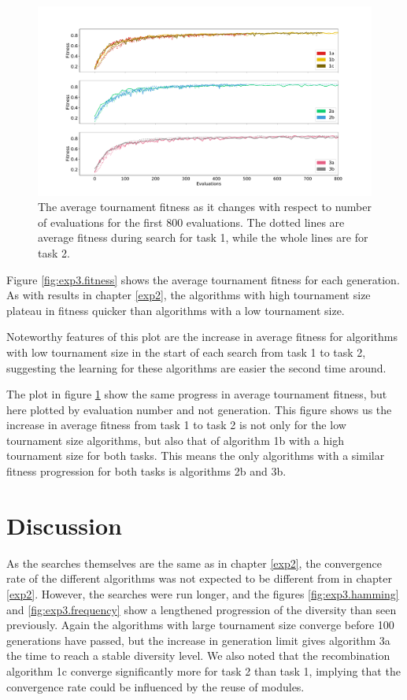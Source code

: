 \begin{figure}
    \includegraphics[width=1.25\textwidth, center]{Chapters/4.Experiments/exp3/figures/fitness_by_evaluations.pdf}
    \caption[Average tournament fitness plotted by evaluation]{The average tournament fitness as it changes with respect to number of evaluations for the first 800 evaluations. The dotted lines are average fitness during search for task 1, while the whole lines are for task 2.}
    \label{fig:exp3.fitness_by_evaluations}
\end{figure}

Figure \ref{fig:exp3.fitness} shows the average tournament fitness for each generation. As with results in chapter \ref{exp2}, the algorithms with high tournament size plateau in fitness quicker than algorithms with a low tournament size.

Noteworthy features of this plot are the increase in average fitness for algorithms with low tournament size in the start of each search from task 1 to task 2, suggesting the learning for these algorithms are easier the second time around. 

The plot in figure \ref{fig:exp3.fitness_by_evaluations} show the same progress in average tournament fitness, but here plotted by evaluation number and not generation. This figure shows us the increase in average fitness from task 1 to task 2 is not only for the low tournament size algorithms, but also that of algorithm 1b with a high tournament size for both tasks. This means the only algorithms with a similar fitness progression for both tasks is algorithms 2b and 3b. 

\section{Discussion}
As the searches themselves are the same as in chapter \ref{exp2}, the convergence rate of the different algorithms was not expected to be different from in chapter \ref{exp2}. However, the searches were run longer, and the figures \ref{fig:exp3.hamming} and \ref{fig:exp3.frequency} show a lengthened progression of the diversity than seen previously. Again the algorithms with large tournament size converge before 100 generations have passed, but the increase in generation limit gives algorithm 3a the time to reach a stable diversity level. We also noted that the recombination algorithm 1c converge significantly more for task 2 than task 1, implying that the convergence rate could be influenced by the reuse of modules. 

